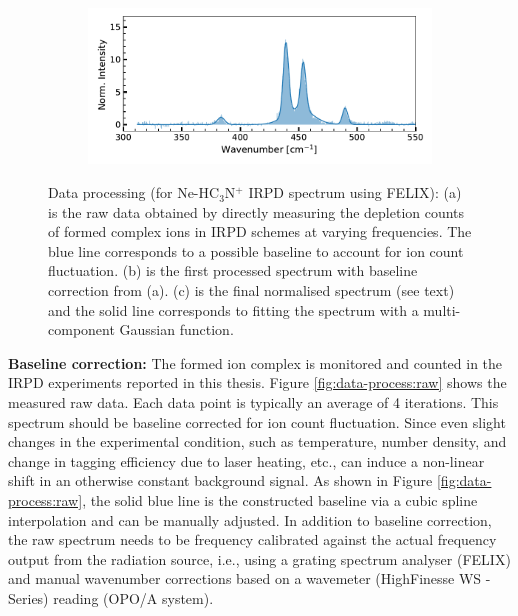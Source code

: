 \begin{figure}[!htb]
    \begin{subfigure}[b]{0.45\textwidth}
        \centering
        \includegraphics[width=1\textwidth]{figures/IR-data-norm/normalised.pdf}
        \caption{}
        \label{fig:data-process:normalised}
    \end{subfigure}
    
    \caption{Data processing (for Ne-HC$_3$N$^+$ IRPD spectrum using FELIX): (a) is the raw data obtained by directly measuring the depletion counts of formed complex ions in IRPD schemes at varying frequencies. The blue line corresponds to a possible baseline to account for ion count fluctuation. (b) is the first processed spectrum with baseline correction from (a). (c) is the final normalised spectrum (see text) and the solid line corresponds to fitting the spectrum with a multi-component Gaussian function.}
    \label{fig:data-process}
\end{figure}

\textbf{Baseline correction:} The formed ion complex is monitored and counted in the IRPD experiments reported in this thesis. Figure \ref{fig:data-process:raw} shows the measured raw data. Each data point is typically an average of 4 iterations. This spectrum should be baseline corrected for ion count fluctuation. Since even slight changes in the experimental condition, such as temperature, number density, and change in tagging efficiency due to laser heating, etc., can induce a non-linear shift in an otherwise constant background signal. As shown in Figure \ref{fig:data-process:raw}, the solid blue line is the constructed baseline via a cubic spline interpolation and can be manually adjusted. In addition to baseline correction, the raw spectrum needs to be frequency calibrated against the actual frequency output from the radiation source, i.e., using a grating spectrum analyser (FELIX) and manual wavenumber corrections based on a wavemeter (HighFinesse WS - Series) reading (OPO/A system).\\

